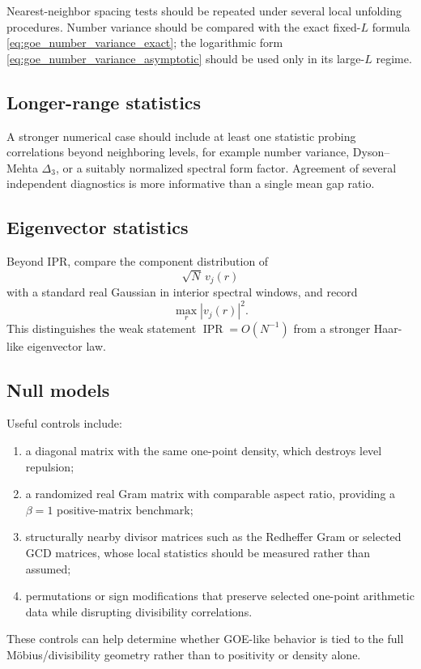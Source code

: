 \documentclass[11pt]{amsart}
\numberwithin{equation}{section}
\theoremstyle{plain}
\theoremstyle{definition}
\theoremstyle{remark}
\newcommand{\IPR}{\operatorname{IPR}}
\begin{document}
Nearest-neighbor spacing tests should be repeated under several local unfolding procedures.  Number variance should be compared with the exact fixed-$L$ formula \eqref{eq:goe_number_variance_exact}; the logarithmic form \eqref{eq:goe_number_variance_asymptotic} should be used only in its large-$L$ regime.

\subsection{Longer-range statistics}
\label{subsec:long_range_protocol}

A stronger numerical case should include at least one statistic probing correlations beyond neighboring levels, for example number variance, Dyson--Mehta $\Delta_3$, or a suitably normalized spectral form factor.  Agreement of several independent diagnostics is more informative than a single mean gap ratio.

\subsection{Eigenvector statistics}
\label{subsec:eigenvector_protocol}

Beyond IPR, compare the component distribution of
\begin{equation}
\sqrt N\,v_j(r)
\label{eq:scaled_eigenvector_component}
\end{equation}
with a standard real Gaussian in interior spectral windows, and record
\begin{equation}
\max_r |v_j(r)|^2.
\label{eq:eigenvector_sup_norm}
\end{equation}
This distinguishes the weak statement $\IPR=O(N^{-1})$ from a stronger Haar-like eigenvector law.

\subsection{Null models}
\label{subsec:null_models}

Useful controls include:
\begin{enumerate}[label=(\roman*)]
\item a diagonal matrix with the same one-point density, which destroys level repulsion;
\item a randomized real Gram matrix with comparable aspect ratio, providing a $\beta=1$ positive-matrix benchmark;
\item structurally nearby divisor matrices such as the Redheffer Gram or selected GCD matrices, whose local statistics should be measured rather than assumed;
\item permutations or sign modifications that preserve selected one-point arithmetic data while disrupting divisibility correlations.
\end{enumerate}
These controls can help determine whether GOE-like behavior is tied to the full M\"obius/divisibility geometry rather than to positivity or density alone.
\end{document}

